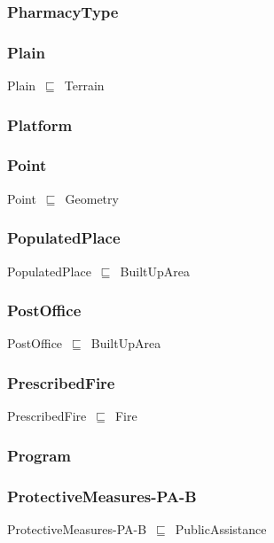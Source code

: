 \documentclass{article}
\begin{document}
\subsubsection*{PharmacyType}

\subsubsection*{Plain}

Plain~\ensuremath{\sqsubseteq}~Terrain~

\subsubsection*{Platform}

\subsubsection*{Point}

Point~\ensuremath{\sqsubseteq}~Geometry~

\subsubsection*{PopulatedPlace}

PopulatedPlace~\ensuremath{\sqsubseteq}~BuiltUpArea~

\subsubsection*{PostOffice}

PostOffice~\ensuremath{\sqsubseteq}~BuiltUpArea~

\subsubsection*{PrescribedFire}

PrescribedFire~\ensuremath{\sqsubseteq}~Fire~

\subsubsection*{Program}

\subsubsection*{ProtectiveMeasures-PA-B}

ProtectiveMeasures-PA-B~\ensuremath{\sqsubseteq}~PublicAssistance~
\end{document}
